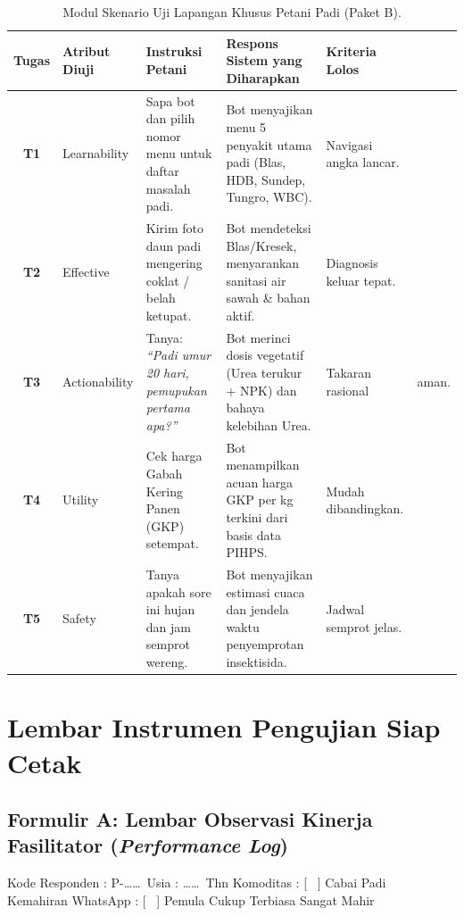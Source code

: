 \documentclass[11pt,a4paper]{article}
\begin{document}
\begin{table}[htbp]
\centering
\small
\caption{Modul Skenario Uji Lapangan Khusus Petani Padi (Paket B).}
\label{tab:skenario_padi_lengkap}
\begin{tabularx}{\textwidth}{c l X X l}
\toprule
\textbf{Tugas} & \textbf{Atribut Diuji} & \textbf{Instruksi Petani} & \textbf{Respons Sistem yang Diharapkan} & \textbf{Kriteria Lolos} \\
\midrule
\textbf{T1} & Learnability & Sapa bot dan pilih nomor menu untuk daftar masalah padi. & Bot menyajikan menu 5 penyakit utama padi (Blas, HDB, Sundep, Tungro, WBC). & Navigasi angka lancar. \\
\textbf{T2} & Effective & Kirim foto daun padi mengering coklat / belah ketupat. & Bot mendeteksi Blas/Kresek, menyarankan sanitasi air sawah \& bahan aktif. & Diagnosis keluar tepat. \\
\textbf{T3} & Actionability & Tanya: \textit{``Padi umur 20 hari, pemupukan pertama apa?''} & Bot merinci dosis vegetatif (Urea terukur + NPK) dan bahaya kelebihan Urea. & Takaran rasional & aman. \\
\textbf{T4} & Utility & Cek harga Gabah Kering Panen (GKP) setempat. & Bot menampilkan acuan harga GKP per kg terkini dari basis data PIHPS. & Mudah dibandingkan. \\
\textbf{T5} & Safety & Tanya apakah sore ini hujan dan jam semprot wereng. & Bot menyajikan estimasi cuaca dan jendela waktu penyemprotan insektisida. & Jadwal semprot jelas. \\
\bottomrule
\end{tabularx}
\end{table}

\section{Lembar Instrumen Pengujian Siap Cetak}

\subsection{Formulir A: Lembar Observasi Kinerja Fasilitator (\textit{Performance Log})}
\noindent
Kode Responden : P-\dots\dots\ \quad Usia : \dots\dots\ Thn \quad Komoditas : [ \ ] Cabai \quad [ \ ] Padi \\
Kemahiran WhatsApp : [ \ ] Pemula \quad [ \ ] Cukup Terbiasa \quad [ \ ] Sangat Mahir
\end{document}
